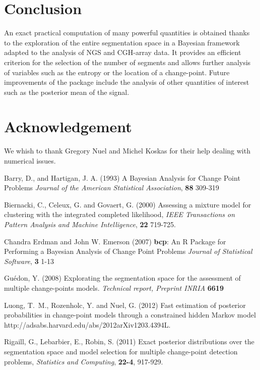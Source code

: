\documentclass{bioinfo}
\begin{document}
\begin{methods}
\section{Conclusion}

An exact practical computation of many powerful quantities is obtained thanks to the exploration of the entire segmentation space in a Bayesian framework adapted to the analysis of NGS and CGH-array data.
It provides an efficient criterion for the selection of the number of segments and allows further analysis of variables such as the entropy or the location of a change-point. 
Future improvements of the package include the analysis of other quantities of interest such as the posterior mean of the signal.



\section*{Acknowledgement}
We whish to thank Gregory Nuel and Michel Koskas for their help dealing with numerical issues.


%
%
%
%
%
%
%
%
%


\begin{thebibliography}{}

 Barry, D., and Hartigan, J. A. (1993) A Bayesian Analysis for Change Point Problems {\it Journal of the American Statistical Association}, {\bf 88} 309-319

 Biernacki, C., Celeux, G. and Govaert, G. (2000) Assessing a mixture model for clustering with the integrated completed likelihood, {\it{IEEE} Transactions on Pattern Analysis and Machine Intelligence}, {\bf 22} 719-725.

   Chandra Erdman and John W. Emerson (2007) {\bf{bcp}}: An {R} Package for Performing a Bayesian Analysis
      of Change Point Problems {\it Journal of Statistical Software}, {\bf 3} 1-13

 Guédon, Y. (2008) Explorating the segmentation space for the assessment of multiple change-points models. {\it Technical report, Preprint INRIA} {\bf 6619}

 Luong, T.~M., Rozenholc, Y. and Nuel, G. (2012) Fast estimation of posterior probabilities in change-point models through a constrained hidden Markov model {http://adsabs.harvard.edu/abs/2012arXiv1203.4394L}.

 Rigaill, G., Lebarbier, E., Robin, S. (2011) Exact posterior distributions over the segmentation space and model selection for multiple change-point detection problems, {\it Statistics and Computing}, {\bf 22-4}, 917-929.

\end{thebibliography}
\end{methods}
\end{document}
